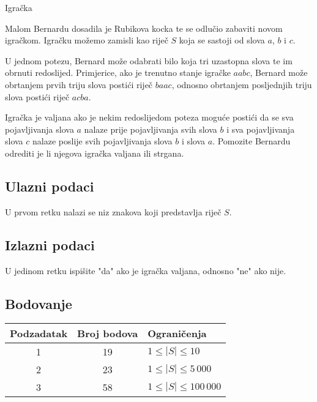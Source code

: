 \begin{statement}[
  problempoints=100,
  timelimit=1 sekunda,
  memorylimit=512 MiB,
]{Igračka}

Malom Bernardu dosadila je Rubikova kocka te se odlučio zabaviti novom igračkom. Igračku možemo zamisli kao riječ $S$ koja se sastoji od slova $a$, $b$ i $c$.

U jednom potezu, Bernard može odabrati bilo koja tri uzastopna slova te im obrnuti redoslijed. Primjerice, ako je trenutno stanje igračke $aabc$, Bernard može obrtanjem prvih triju slova postići riječ $baac$, odnosno obrtanjem posljednjih triju slova postići riječ $acba$. 

Igračka je valjana ako je nekim redoslijedom poteza moguće postići da se sva pojavljivanja slova $a$ nalaze prije pojavljivanja svih slova $b$ i sva pojavljivanja slova $c$ nalaze poslije svih pojavljivanja slova $b$ i slova $a$. Pomozite Bernardu odrediti je li njegova igračka valjana ili strgana.

\subsection*{Ulazni podaci}

U prvom retku nalazi se niz znakova koji predstavlja riječ $S$.

\subsection*{Izlazni podaci}

U jedinom retku ispišite "da" ako je igračka valjana, odnosno "ne" ako nije.

\subsection*{Bodovanje}

{\renewcommand{\arraystretch}{1.4}
  \setlength{\tabcolsep}{6pt}
  \begin{tabular}{ccl}
   Podzadatak & Broj bodova & Ograničenja \\ \midrule
    1 & 19 & $1 \le |S| \le 10$\\
    2 & 23 & $1 \le |S| \le 5\,000$ \\
    3 & 58 & $1 \le |S| \le 100\,000$ \\
\end{tabular}}


\end{statement}
